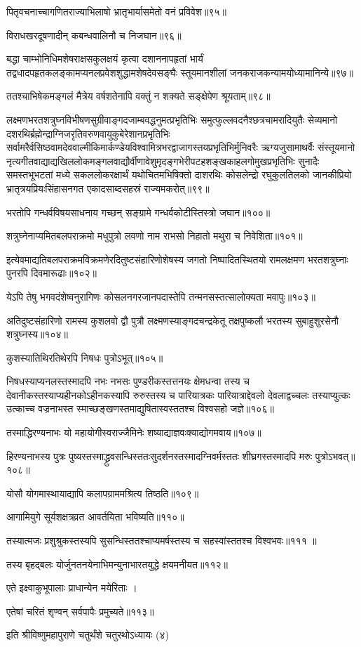 पितृवचनाच्चागणितराज्याभिलाषो भ्रातृभार्यासमेतो वनं प्रविवेश॥९५॥

विराधखरदूषणादीन् कबन्धवालिनौ च निजघान॥९६॥

बद्धा चाम्भोनिधिमशेषराक्षसकुलक्षयं कृत्वा दशाननापहृतां भार्यं
तद्वधादपहृतकलङ्कामप्यनलप्रवेशशुद्धामशेषदेवसङ्घैः स्तूयमानशीलां जनकराजकन्यामयोध्यामानिन्ये॥९७॥

ततश्चाभिषेकमङ्गलं मैत्रेय वर्षशतेनापि वक्तुं न शक्यते सङ्क्षेपेण श्रूयताम्॥९८॥

लक्ष्मणभरतशत्रुघ्नविभीषणसुग्रीवाङ्गदजाम्बवद्धनुमत्प्रभृतिभिः समुत्फुल्लवदनैश्छत्रचामरादियुतैः
सेव्यमानो दशरथिर्ब्रह्मेन्द्राग्निजरृतिवरुणवायुकुबेरेशानप्रभृतिभिः
सर्वामरैर्वसिष्ठवामदेववाल्मीकिमार्कण्डेयविश्वामित्रभरद्वाजागस्तयप्रभृतिभिर्मुनिवरैः
ऋग्यजुसामाथर्वैः संस्तूयमानो
नृत्यगीतवाद्याद्यखिललोकमङ्गलवाद्यौर्वीणावेशुमृदङ्गभेरीपटहशङ्खकाहलगोमुखप्रभृतिभिः सुनादैः
समस्तभूभटतां मध्ये सकललोकरक्षार्थं यथोचितमभिषिक्तो दाशरथिः कोसलेन्द्रो रघुकुलतिलको
जानकीप्रियो भ्रातृत्रयप्रियःसिंहासनगत एकादसाब्दसहस्रं राज्यमकरोत्॥९९॥

भरतोपि गन्धर्वविषयसाधनाय गच्छन् सङ्ग्रामे गन्धर्वकोटीस्तिस्त्रो जघान॥१००॥

शत्रुघ्नेनाप्यमितबलपराक्रमो मधुपुत्रो लवणो नाम राभसो निहातो मथुरा च निवेशिता॥१०१॥

इत्येवमाद्यतिबलपराक्रमविक्रमणेरदितुष्टसंहारिणोशेषस्य जगतो निष्पादितस्थितयो रामलक्षमण
भरतशत्रुघ्नाः पुनरपि दिवमारूढाः॥१०२॥

येऽपि तेषु भगवदंशेष्वनुरागिणः कोसलनगरजानपदास्तेपि तन्मनसस्तत्सालोक्यता मवापुः॥१०३॥

अतिदुष्टसंहारिणो रामस्य कुशलवो द्वौ पुत्रौ लक्ष्मणस्याङ्गदचन्द्रकेतू तक्षपुष्कलौ भरतस्य
सुबाहुशुरसेनौ शत्रुघ्नस्य॥१०४॥

कुशस्यातिथिरतिथेरपि निषधः पुत्रोऽभूत्॥१०५॥

निषधस्याप्यनलस्तस्मादपि नभः नभसः पुण्डरीकस्तत्तनयः क्षेमधन्वा तस्य च
देवानीकस्तस्याप्यहीनकोऽहीनकस्यापि रुरुस्तस्य च पारियात्रकः पारियात्राद्देवलो
देवलाद्वच्चलः तस्याप्युत्कः उत्काच्च वज्रनाभस्त स्माच्छङ्खणस्तमाद्युषितास्वस्ततश्च विश्वसहो
जज्ञे॥१०६॥

तस्माद्धिरण्यनाभः यो महायोगीस्वराज्जैमिनेः शष्याद्याज्ञवःक्याद्योगमवाय॥१०७॥

हिरण्यनाभस्य पुत्रः पुष्यस्तस्माद्ध्रुवसन्धिस्ततःसुदर्शनस्तस्मादग्निवर्मस्ततः शीघ्रगस्तस्मादपि
मरुः पुत्रोऽभवत्॥१०८॥

योसौ योगमास्थायाद्यापि कलापग्राममश्रित्य तिष्ठति॥१०९॥

आगामियुगे सूर्यशक्षत्रव्रत आवर्तयिता भविष्यति॥११०॥

तस्यात्मजः प्रशुश्रुकस्तस्यपि सुसन्धिस्ततश्चाप्यमर्षस्तस्य च सहस्वांस्ततश्च विश्वभवः॥१११
॥

तस्य बृहद्बलः योर्जुनतनयेनाभिमन्युनाभारतयुद्धे क्षयमनीयत॥११२॥

एते इक्ष्वाकुभूपालाः प्राधान्येन मयेरिताः ।

एतेषां चरितं शृण्वन् सर्वपापैः प्रमुच्यते॥११३॥

इति श्रीविष्णुमहापुराणे चतुर्थंशे चतुरथोऽध्यायः (४)